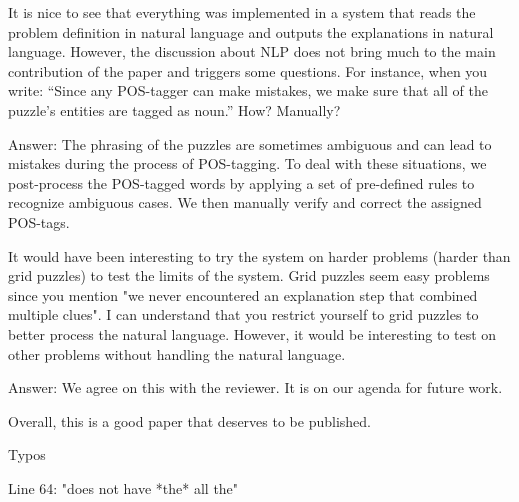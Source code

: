 \documentclass{article}
\newcommand\comment[1]{\marginpar{\tiny #1}}
\renewcommand\comment[1]{#1}
\newcommand{\emilio}[1]{{\comment{Answer: \color{red}#1}}}
\newcommand{\new}[1]{{\comment{{\color{blue} #1}}}}
\begin{document}
\begin{quoteit}
It is nice to see that everything was implemented in a system that reads the problem definition in natural language and outputs the explanations in natural language. However, the discussion about NLP does not bring much to the main contribution of the paper and triggers some questions.
For instance, when you write: ``Since any POS-tagger can make mistakes, we make sure that all of the puzzle's entities are tagged as noun.'' How? Manually?
\end{quoteit}

\emilio{The phrasing of the puzzles are sometimes ambiguous and can lead to mistakes during the process of POS-tagging. To deal with these situations, we post-process the POS-tagged words by applying a set of pre-defined rules to recognize ambiguous cases. We then manually verify and correct the assigned POS-tags.}

\begin{quoteit}
It would have been interesting to try the system on harder problems (harder than grid puzzles) to test the limits of the system.  Grid puzzles seem easy problems since you mention "we never encountered an explanation step that combined multiple clues".  I can understand that you restrict yourself to grid puzzles to better process the natural language. However, it would be interesting to test on other problems without handling the natural language.
\end{quoteit}

\emilio{We agree on this with the reviewer. It is on our agenda for future work.}

Overall, this is a good paper that deserves to be published. 

Typos

Line 64: "does not have *the* all the"
\end{document}
